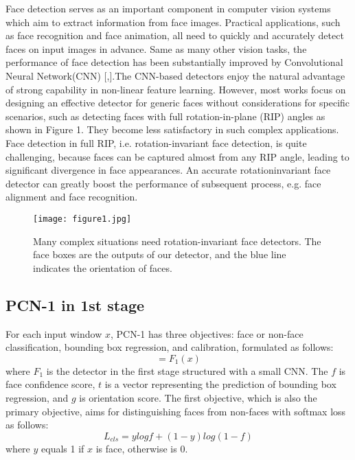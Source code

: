 \documentclass[10pt,twocolumn,letterpaper]{article}
\begin{document}
Face detection serves as an important component in computer
vision systems which aim to extract information from
face images. Practical applications, such as face recognition
and face animation, all need to quickly and accurately detect
faces on input images in advance. Same as many other
vision tasks, the performance of face detection has been
substantially improved by Convolutional Neural Network(CNN)
[\cite{Alpher02},\cite{Alpher03}].The CNN-based
detectors enjoy the natural advantage of strong capability
in non-linear feature learning. However, most works focus
on designing an effective detector for generic faces without
considerations for specific scenarios, such as detecting faces
with full rotation-in-plane (RIP) angles as shown in Figure
1. They become less satisfactory in such complex applications.
Face detection in full RIP, i.e. rotation-invariant
face detection, is quite challenging, because faces can be
captured almost from any RIP angle, leading to significant
divergence in face appearances. An accurate rotationinvariant
face detector can greatly boost the performance of
subsequent process, e.g. face alignment and face recognition.

\begin{figure}[t]
\begin{center}
   \texttt{[image: figure1.jpg]}
\end{center}
   \caption{Many complex situations need rotation-invariant face detectors.
The face boxes are the outputs of our detector, and the blue
line indicates the orientation of faces.}
\label{fig:long}
\label{fig:onecol}
\end{figure}

\subsection{PCN-1 in 1st stage}
For each input window $\mathit{x}$, PCN-1 has three objectives:
face or non-face classification, bounding box regression,
and calibration, formulated as follows:
\begin{equation}
[f,g,t] = F_{1}(x)
\end{equation}
where $\mathit{F_{1}}$ is the detector in the first stage structured with a
small CNN. The $\mathit{f}$ is face confidence score, $\mathit{t}$ is a vector
representing the prediction of bounding box regression, and
$\mathit{g}$ is orientation score.
The first objective, which is also the primary objective,
aims for distinguishing faces from non-faces with softmax
loss as follows:
\begin{equation}
L_{cls} = ylogf + (1-y)log(1-f)
\end{equation}
where $\mathit{y}$ equals 1 if $\mathit{x}$ is face, otherwise is 0.
\end{document}
